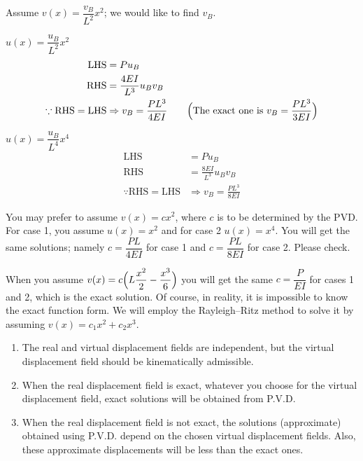 \begin{example}[P.V.D.]
Assume $v(x) = \dfrac{v_B}{L^2}x^2$; we would like to find $v_B$.
\begin{description}[leftmargin=2em]
  \item[Case 1:] $u(x) = \dfrac{u_B}{L^2}x^2$
    \begin{align*}
      \text{LHS} &= Pu_B\\
      \text{RHS} &= \frac{4EI}{L^3}u_Bv_B\\
      \because\text{RHS} = \text{LHS} &\Rightarrow v_B = \frac{PL^3}{4EI}\qquad\Bigl(\text{The exact one is } v_B = \frac{PL^3}{3EI}\Bigr)
    \end{align*}
  \item[Case 2:] $u(x) = \dfrac{u_B}{L^4}x^4$
    \begin{align*}
      \text{LHS} &= Pu_B\\
      \text{RHS} &= \frac{8EI}{L^3}u_Bv_B\\
      \because\text{RHS} = \text{LHS} &\Rightarrow v_B = \frac{PL^3}{8EI}
    \end{align*}
\end{description}
\begin{note}
You may prefer to assume $v(x) = cx^2$, where $c$ is to be determined by the PVD. For case 1, you assume $u(x) = x^2$ and for case 2 $u(x) = x^4$. You will get the same solutions; namely $c = \dfrac{PL}{4EI}$ for case 1 and $c = \dfrac{PL}{8EI}$ for case 2. Please check.

When you assume $v(x) = c\Bigl(L\dfrac{x^2}{2} - \dfrac{x^3}{6}\Bigr)$ you will get the same $c = \dfrac{P}{EI}$ for cases 1 and 2, which is the exact solution. Of course, in reality, it is impossible to know the exact function form. We will employ the Rayleigh--Ritz method to solve it by assuming $v(x) = c_1x^2 + c_2x^3$.
\end{note}

\begin{enumerate}
  \item The real and virtual displacement fields are independent, but the virtual displacement field should be kinematically admissible.
  \item When the real displacement field is exact, whatever you choose for the virtual displacement field, exact solutions will be obtained from P.V.D.
  \item When the real displacement field is not exact, the solutions (approximate) obtained using P.V.D. depend on the chosen virtual displacement fields. Also, these approximate displacements will be less than the exact ones.
\end{enumerate}
\end{example}

